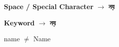 \begin{rememberbox}
\begin{itemize}
\begin{center}
\medskip

\textbf{Space / Special Character}
\(\longrightarrow\)
\textbf{নয়}

\qquad

\textbf{Keyword}
\(\longrightarrow\)
\textbf{নয়}

\medskip

\textenglish{\ttfamily name}
\(\neq\)
\textenglish{\ttfamily Name}

\end{center}

\end{itemize}

\end{rememberbox}

\small


